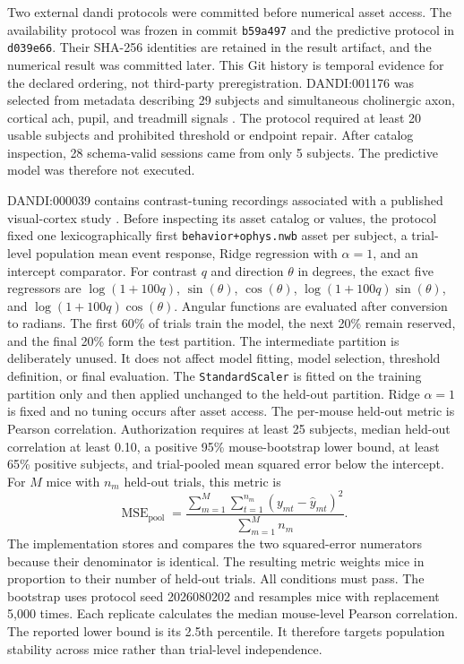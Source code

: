 Two external \ac{dandi} protocols were committed before numerical asset access. The availability protocol was frozen in commit \texttt{b59a497} and the predictive protocol in \texttt{d039e66}. Their SHA-256 identities are retained in the result artifact, and the numerical result was committed later. This Git history is temporal evidence for the declared ordering, not third-party preregistration. DANDI:001176 was selected from metadata describing 29 subjects and simultaneous cholinergic axon, cortical \ac{ach}, pupil, and treadmill signals \citep{neyhart2024ach}. The protocol required at least 20 usable subjects and prohibited threshold or endpoint repair. After catalog inspection, 28 schema-valid sessions came from only 5 subjects. The predictive model was therefore not executed.

DANDI:000039 contains contrast-tuning recordings associated with a published visual-cortex study \citep{millman2020vip}. Before inspecting its asset catalog or values, the protocol fixed one lexicographically first \texttt{behavior+ophys.nwb} asset per subject, a trial-level population mean event response, Ridge regression with $\alpha=1$, and an intercept comparator. For contrast $q$ and direction $\theta$ in degrees, the exact five regressors are $\log(1+100q)$, $\sin(\theta)$, $\cos(\theta)$, $\log(1+100q)\sin(\theta)$, and $\log(1+100q)\cos(\theta)$. Angular functions are evaluated after conversion to radians. The first 60\% of trials train the model, the next 20\% remain reserved, and the final 20\% form the test partition. The intermediate partition is deliberately unused. It does not affect model fitting, model selection, threshold definition, or final evaluation. The \texttt{StandardScaler} is fitted on the training partition only and then applied unchanged to the held-out partition. Ridge $\alpha=1$ is fixed and no tuning occurs after asset access. The per-mouse held-out metric is Pearson correlation. Authorization requires at least 25 subjects, median held-out correlation at least 0.10, a positive 95\% mouse-bootstrap lower bound, at least 65\% positive subjects, and trial-pooled mean squared error below the intercept. For $M$ mice with $n_m$ held-out trials, this metric is
\begin{equation}
\operatorname{MSE}_{\mathrm{pool}}=
\frac{\sum_{m=1}^{M}\sum_{t=1}^{n_m}(y_{mt}-\widehat{y}_{mt})^2}
{\sum_{m=1}^{M}n_m}.
\label{eq:dandi-pooled-mse}
\end{equation}
The implementation stores and compares the two squared-error numerators because their denominator is identical. The resulting metric weights mice in proportion to their number of held-out trials. All conditions must pass. The bootstrap uses protocol seed 2026080202 and resamples mice with replacement 5,000 times. Each replicate calculates the median mouse-level Pearson correlation. The reported lower bound is its 2.5th percentile. It therefore targets population stability across mice rather than trial-level independence.

